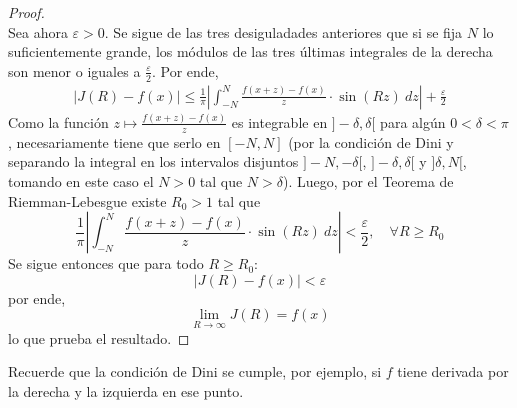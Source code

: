 \documentclass[12pt]{report}
\theoremstyle{largebreak}
\renewcommand{\leq}{\ensuremath{\leqslant}}
\renewcommand{\geq}{\ensuremath{\geqslant}}
\newcommand\abs[1]{\ensuremath{\left|#1\right|}}
\begin{document}
\begin{proof}
\begin{equation*}
        \end{equation*}
        Sea ahora $\varepsilon>0$. Se sigue de las tres desiguladades anteriores que si se fija $N$ lo suficientemente grande, los módulos de las tres últimas integrales de la derecha son menor o iguales a $\frac{\varepsilon}{2}$. Por ende,
        \begin{equation*}
            \begin{split}
                \abs{J(R)-f(x)}\leq\frac{1}{\pi}\abs{\int_{-N}^{N}\frac{f(x+z)-f(x)}{z}\cdot\sin(Rz)\:dz}+\frac{\varepsilon}{2}
            \end{split}
        \end{equation*}
        Como la función $z\mapsto\frac{f(x+z)-f(x)}{z}$ es integrable en $]-\delta,\delta[$ para algún $0<\delta<\pi$, necesariamente tiene que serlo en $[-N,N]$ (por la condición de Dini y separando la integral en los intervalos disjuntos $]-N,-\delta[$, $]-\delta,\delta[$ y $]\delta, N[$, tomando en este caso el $N>0$ tal que $N>\delta$). Luego, por el Teorema de Riemman-Lebesgue existe $R_0>1$ tal que
        \begin{equation*}
            \frac{1}{\pi}\abs{\int_{-N}^{N}\frac{f(x+z)-f(x)}{z}\cdot\sin(Rz) \:dz}<\frac{\varepsilon}{2},\quad\forall R\geq R_0
        \end{equation*} 
        Se sigue entonces que para todo $R\geq R_0$:
        \begin{equation*}
            \abs{J(R)-f(x)}<\varepsilon
        \end{equation*}
        por ende,
        \begin{equation*}
            \lim_{ R\rightarrow\infty}J(R)=f(x)
        \end{equation*}
        lo que prueba el resultado.
    \end{proof}

    \begin{obs}
        Recuerde que la condición de Dini se cumple, por ejemplo, si $f$ tiene derivada por la derecha y la izquierda en ese punto.
    \end{obs}
\end{document}
